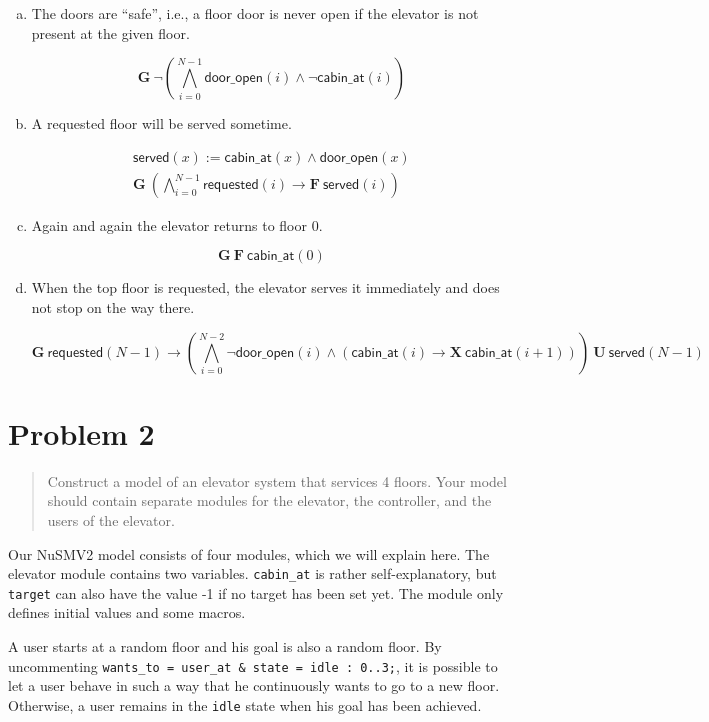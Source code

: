 \documentclass[a4paper,10pt]{article}
\newcommand{\LTLG}{\mathbf{G~}}
\newcommand{\LTLF}{\mathbf{F~}}
\newcommand{\LTLX}{\mathbf{X~}}
\newcommand{\LTLU}{\mathbf{~U~}}
\newcommand{\conjall}[2]{\mathop{\bigwedge}\limits_{#1}^{#2}}
\newcommand{\dooropen}[1]{\mathsf{door\_open}(#1)}
\newcommand{\cabinat}[1]{\mathsf{cabin\_at}(#1)}
\newcommand{\requested}[1]{\mathsf{requested}(#1)}
\newcommand{\served}[1]{\mathsf{served}(#1)}
\newcommand{\imply}{\rightarrow}
\begin{document}
	\begin{enumerate}[(a)]
		\item
			The doors are ``safe'', i.e., a floor door is never open if the elevator is not present at the given floor.
			
			\[
				\LTLG \neg \left( \conjall{i=0}{N-1} \dooropen{i} \wedge \neg \cabinat{i} \right)
			\]
		
		\item
			A requested floor will be served sometime.
			
			\begin{align*}
				\served{x} := \cabinat{x} \wedge \dooropen{x} \\
				\LTLG \left( \conjall{i=0}{N-1} \requested{i} \imply \LTLF \served{i} \right)
			\end{align*}
		
		\item
			Again and again the elevator returns to floor 0.
			
			\[
				\LTLG \LTLF \cabinat{0}
			\]
		
		\item
			When the top floor is requested, the elevator serves it immediately and does not stop on the way there.
			
			\[
				\LTLG \requested{N-1} \imply
					\left(
						\conjall{i=0}{N-2}
							\neg \dooropen{i} \wedge ( \cabinat{i} \imply \LTLX \cabinat{i+1} )
					\right)
					\LTLU
					\served{N-1}
			\]
	\end{enumerate}
	
	\section{Problem 2}
	
	\begin{quote}
		Construct a model of an elevator system that services 4 floors. Your model should contain separate modules for the elevator, the controller, and the users of the elevator.
	\end{quote}
	
	Our NuSMV2 model consists of four modules, which we will explain here. The elevator module contains two variables. \texttt{cabin\_at} is rather self-explanatory, but \texttt{target} can also have the value -1 if no target has been set yet. The module only defines initial values and some macros.
	
	A user starts at a random floor and his goal is also a random floor. By uncommenting \texttt{wants\_to = user\_at \& state = idle : 0..3;}, it is possible to let a user behave in such a way that he continuously wants to go to a new floor. Otherwise, a user remains in the \texttt{idle} state when his goal has been achieved.
	
\end{document}
